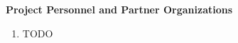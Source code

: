 \documentclass[10pt]{SelfArx}
\begin{document}
\pagestyle{plain}

\begin{center}
{\color{color1} \bf \large
Project Personnel and Partner Organizations}
\end{center}

\begin{enumerate}
\item TODO
\end{enumerate}
\end{document}
